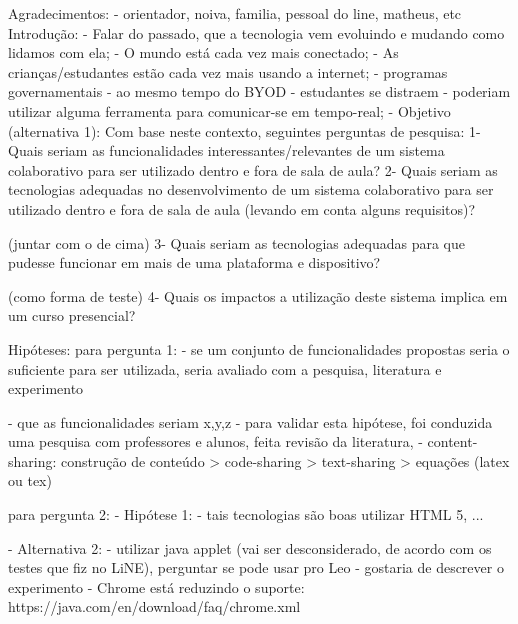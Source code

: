 \iffalse
        Agradecimentos: 
            - orientador, noiva, familia, pessoal do line, matheus, etc
        Introdução:
            - Falar do passado, que a tecnologia vem evoluindo e mudando como lidamos com ela;
            - O mundo está cada vez mais conectado;
            - As crianças/estudantes estão cada vez mais usando a internet;
            - programas governamentais 
            - ao mesmo tempo do BYOD
                - estudantes se distraem
                - poderiam utilizar alguma ferramenta para comunicar-se em tempo-real;
            - Objetivo (alternativa 1):
                Com base neste contexto, seguintes perguntas de pesquisa:
                    1- Quais seriam as funcionalidades interessantes/relevantes de um sistema colaborativo para ser utilizado dentro e fora de sala de aula?
                    2- Quais seriam as tecnologias adequadas no desenvolvimento de um sistema colaborativo para ser utilizado dentro e fora de sala de aula (levando em conta alguns requisitos)?

                    (juntar com o de cima) 3- Quais seriam as tecnologias adequadas para que pudesse funcionar em mais de uma plataforma e dispositivo?

                    (como forma de teste) 4- Quais os impactos a utilização deste sistema implica em um curso presencial?

                    Hipóteses:
                    para pergunta 1:
                        - se um conjunto de funcionalidades propostas seria o suficiente para ser utilizada, seria avaliado com a pesquisa, literatura e experimento

                        - que as funcionalidades seriam x,y,z
                            - para validar esta hipótese, foi conduzida uma pesquisa com professores e alunos, feita revisão da literatura, 
                        - content-sharing: construção de conteúdo > code-sharing > text-sharing > equações (latex ou tex)

                    para pergunta 2:
                        - Hipótese 1:
                            - tais tecnologias são boas utilizar HTML 5, ...

                            - Alternativa 2:
                                - utilizar java applet (vai ser desconsiderado, de acordo com os testes que fiz no LiNE), perguntar se pode usar pro Leo - gostaria de descrever o experimento
                                - Chrome está reduzindo o suporte:
                                    https://java.com/en/download/faq/chrome.xml

